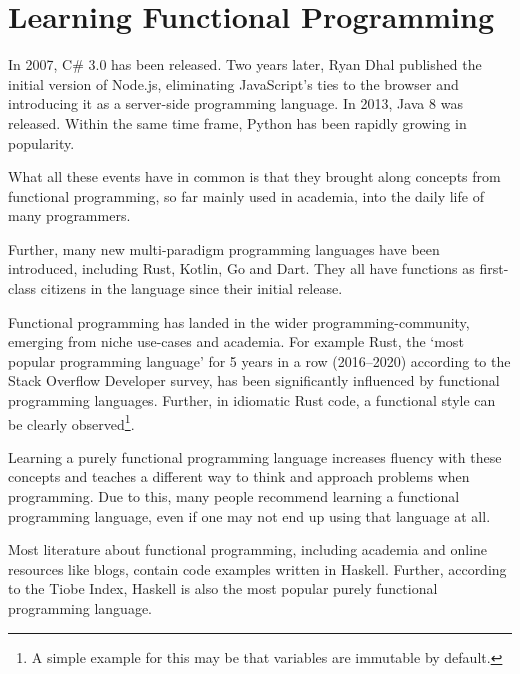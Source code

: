 
\section{Learning Functional Programming}

In 2007, C\# 3.0 has been released. Two years later, Ryan Dhal published the initial version
of Node.js, eliminating JavaScript's ties to the browser and introducing it as a server-side
programming language. In 2013, Java 8 was released. Within the same time frame, Python
has been rapidly growing in popularity\autocite{python-popularity}.

What all these events have in common is that they brought along concepts from functional
programming, so far mainly used in academia, into the daily life of many programmers.

Further, many new multi-paradigm programming languages have been introduced,
including Rust, Kotlin, Go and Dart. They all have functions as first-class citizens in
the language since their initial release.

Functional programming has landed in the wider programming-community, emerging from niche use-cases
and academia.
For example Rust, the `most popular programming language' for 5 years in a row (2016--2020)
according to the Stack Overflow Developer survey\autocite{rust-loved}, has been significantly
influenced by functional programming languages\autocite{rust-functional}. Further, in idiomatic
Rust code, a functional style can be clearly observed\footnote{A simple example for this may be
that variables are immutable by default.}.

Learning a purely functional programming language increases fluency with these concepts and
teaches a different way to think and approach problems when programming. Due to this, many
people recommend learning a functional programming
language\autocite{blog1-funcprog}\autocite{blog2-funcprog}\autocite{blog3-funcprog}\autocite{blog4-funcprog},
even if one may not end up using that language at all\autocite{quora-funcprog}.

Most literature about functional programming,
including academia and online resources like blogs, contain code examples written in Haskell.
Further, according to the Tiobe Index\autocite{tiobe-index}, Haskell is also the most popular
purely functional programming language\autocite{comparison-functional-languages}.

